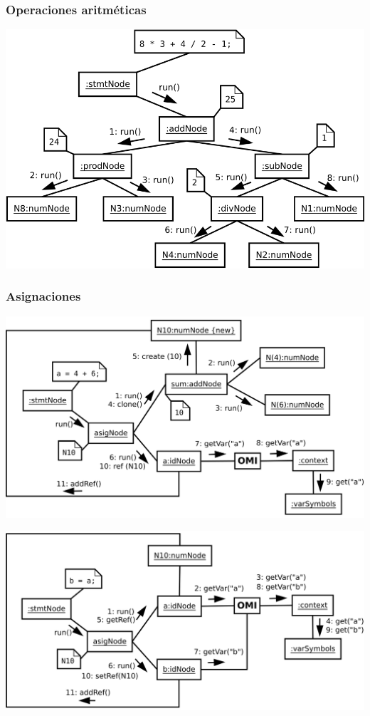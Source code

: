 \subsubsection {Operaciones aritméticas }
\begin{center}
\includegraphics[scale=0.38]{arith.png} \\
\end{center}

\subsubsection {Asignaciones }
\begin{center}
\includegraphics[scale=0.38]{asig.png} \\
\end{center}

\begin{center}
\includegraphics[scale=0.38]{asig2.png} \\
\end{center}

